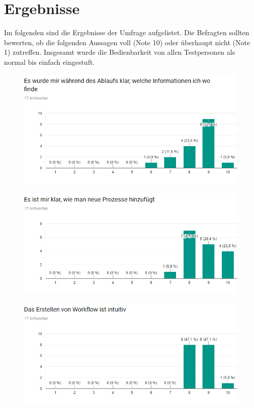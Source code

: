 \newpage

\section{Ergebnisse}
Im folgenden sind die Ergebnisse der Umfrage aufgelistet. \newline
Die Befragten sollten bewerten, ob die folgenden Aussagen voll (Note 10) oder überhaupt nicht (Note 1) zutreffen. \newline
Insgesamt wurde die Bedienbarkeit von allen Testpersonen als normal bis einfach eingestuft.
\begin{figure}[H]
    \centering
    \includegraphics[width=15cm]{diagrams/ErgebnisStat1.jpg}
    \label{Ergebnis1}
\end{figure}

\begin{figure}[H]
    \centering
    \includegraphics[width=15cm]{diagrams/ErgebnisStat2.jpg}
    \label{Ergebnis2}
\end{figure}

\begin{figure}[H]
    \centering
    \includegraphics[width=15cm]{diagrams/ErgebnisStat3.jpg}
    \label{Ergebnis3}
\end{figure}

